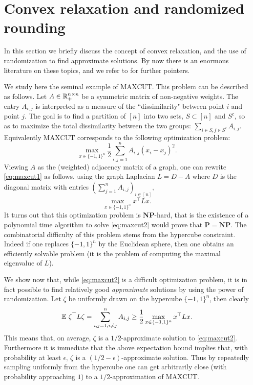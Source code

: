 \section{Convex relaxation and randomized rounding} \label{sec:convexrelaxation}
In this section we briefly discuss the concept of convex relaxation, and the use of randomization to find approximate solutions. By now there is an enormous literature on these topics, and we refer to \cite{Bar14} for further pointers. 

We study here the seminal example of $\mathrm{MAXCUT}$. This problem can be described as follows. Let $A \in \mathbb{R}_+^{n \times n}$ be a symmetric matrix of non-negative weights. The entry $A_{i,j}$ is interpreted as a measure of the ``dissimilarity" between point $i$ and point $j$. The goal is to find a partition of $[n]$ into two sets, $S \subset [n]$ and $S^c$, so as to maximize the total dissimilarity between the two groups: $\sum_{i \in S, j \in S^c} A_{i,j}$. Equivalently $\mathrm{MAXCUT}$ corresponds to the following optimization problem:
\begin{equation} \label{eq:maxcut1}
\max_{x \in \{-1,1\}^n} \frac12 \sum_{i,j =1}^n A_{i,j} (x_i - x_j)^2 .
\end{equation}
Viewing $A$ as the (weighted) adjacency matrix of a graph, one can rewrite \eqref{eq:maxcut1} as follows, using the graph Laplacian $L=D-A$ where $D$ is the diagonal matrix with entries $(\sum_{j=1}^n A_{i,j})_{i \in [n]}$,
\begin{equation} \label{eq:maxcut2}
\max_{x \in \{-1,1\}^n} x^{\top} L x .
\end{equation}
It turns out that this optimization problem is $\mathbf{NP}$-hard, that is the existence of a polynomial time algorithm to solve \eqref{eq:maxcut2} would prove that $\mathbf{P} = \mathbf{NP}$. The combinatorial difficulty of this problem stems from the hypercube constraint. Indeed if one replaces $\{-1,1\}^n$ by the Euclidean sphere, then one obtains an efficiently solvable problem (it is the problem of computing the maximal eigenvalue of $L$).

We show now that, while \eqref{eq:maxcut2} is a difficult optimization problem, it is in fact possible to find relatively good {\em approximate} solutions by using the power of randomization. 
Let $\zeta$ be uniformly drawn on the hypercube $\{-1,1\}^n$, then clearly
$$\mathbb{E} \ \zeta^{\top} L \zeta = \sum_{i,j=1, i \neq j}^n A_{i,j} \geq \frac{1}{2} \max_{x \in \{-1,1\}^n} x^{\top} L x .$$
This means that, on average, $\zeta$ is a $1/2$-approximate solution to \eqref{eq:maxcut2}. Furthermore it is immediate that the above expectation bound implies that, with probability at least $\epsilon$, $\zeta$ is a $(1/2-\epsilon)$-approximate solution. Thus by repeatedly sampling uniformly from the hypercube one can get arbitrarily close (with probability approaching $1$) to a $1/2$-approximation of $\mathrm{MAXCUT}$.

